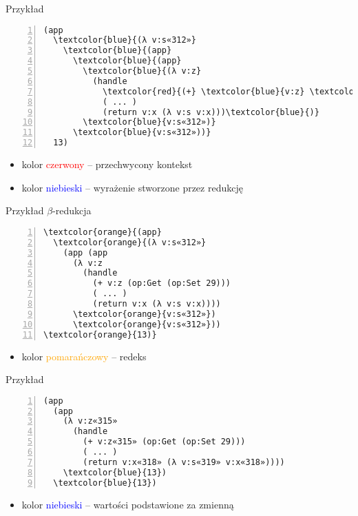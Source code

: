 \documentclass{beamer}
\begin{document}
\begin{frame}[fragile]{Przykład}
\begin{Verbatim}[commandchars=\\\{\},numbers=left]
(app
  \textcolor{blue}{(λ v:s«312»}
    \textcolor{blue}{(app} 
      \textcolor{blue}{(app}
        \textcolor{blue}{(λ v:z}
          (handle
            \textcolor{red}{(+} \textcolor{blue}{v:z} \textcolor{red}{(op:Get (op:Set 29)))}
            ( ... )
            (return v:x (λ v:s v:x)))\textcolor{blue}{)}
        \textcolor{blue}{v:s«312»)}
      \textcolor{blue}{v:s«312»))}
  13)
\end{Verbatim}
\begin{itemize}
  \item kolor \textcolor{red}{czerwony} -- przechwycony kontekst
  \item kolor \textcolor{blue}{niebieski} -- wyrażenie stworzone przez redukcję
\end{itemize}
\end{frame}

\begin{frame}[fragile]{Przykład}
$\beta$-redukcja
\begin{Verbatim}[commandchars=\\\{\},numbers=left]
\textcolor{orange}{(app}
  \textcolor{orange}{(λ v:s«312»}
    (app (app
      (λ v:z
        (handle
          (+ v:z (op:Get (op:Set 29)))
          ( ... )
          (return v:x (λ v:s v:x))))
      \textcolor{orange}{v:s«312»})
      \textcolor{orange}{v:s«312»}))
\textcolor{orange}{13)}
\end{Verbatim}
\begin{itemize}
  \item kolor \textcolor{orange}{pomarańczowy} -- redeks
\end{itemize}
\end{frame}

\begin{frame}[fragile]{Przykład}
\begin{Verbatim}[commandchars=\\\{\},numbers=left]
(app 
  (app
    (λ v:z«315»
      (handle
        (+ v:z«315» (op:Get (op:Set 29)))
        ( ... )
        (return v:x«318» (λ v:s«319» v:x«318»))))
    \textcolor{blue}{13})
  \textcolor{blue}{13})
\end{Verbatim}
\begin{itemize}
  \item kolor \textcolor{blue}{niebieski} -- wartości podstawione za zmienną
\end{itemize}
\end{frame}
\end{document}
